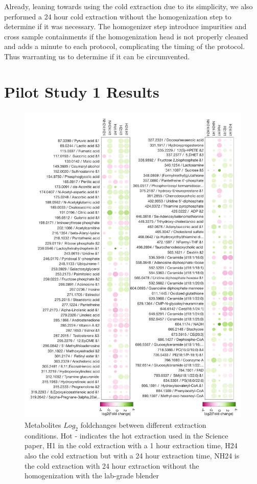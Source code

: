 \documentclass[a4paper,11pt,twoside]{book}
\begin{document}
	Already, leaning towards using the cold extraction due to its simplicity, we also performed a 24 hour cold extraction without the homogenization step to determine if it was necessary. The homogenizer step introduce impurities and cross sample containments if the homogenization head is not properly cleaned and adds a minute to each protocol, complicating the timing of the protocol. Thus warranting us to determine if it can be circumvented.
	
	\section{Pilot Study 1 Results}
	
	\begin{figure}[!ht]
		\centering
		\includegraphics[keepaspectratio,height=.8\textheight]{2.Optimizaiton_Figures/bubbles1.pdf}
		\caption{Metabolites $Log_2$ foldchanges between different extraction conditions. Hot - indicates the hot extraction used in the Science paper, H1 in the cold extraction with a 1 hour extraction  time, H24 also the cold extraction but with a 24 hour extraction time, NH24 is the cold extraction with 24 hour extraction without the homogenization with the lab-grade blender}
		\label{fig:Pilor Study 1 Bubble Chart Results}
	\end{figure}
	
\end{document}
